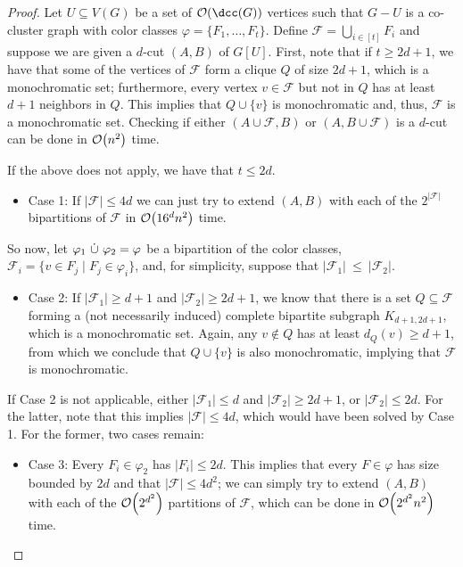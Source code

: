\begin{proof}
    Let $U \subseteq V(G)$ be a set of $\bigO{\dcc(G)}$ vertices such that $G - U$ is a co-cluster graph with color classes $\varphi = \{F_1, \dots, F_t\}$.
    Define $\mathcal{F} = \bigcup_{i \in [t]} F_i$ and suppose we are given a $d$-cut $(A,B)$ of $G[U]$.
    First, note that if $t \geq 2d+1$, we have that some of the vertices of $\mathcal{F}$ form a clique $Q$ of size $2d+1$, which is a monochromatic set; furthermore, every vertex $v \in \mathcal{F}$ but not in $Q$ has at least $d+1$ neighbors in $Q$.
    This implies that $Q \cup \{v\}$ is monochromatic and, thus, $\mathcal{F}$ is a monochromatic set.
    Checking if either $(A \cup \mathcal{F}, B)$ or $(A, B \cup \mathcal{F})$ is a $d$-cut can be done in $\mathcal{O}\!\left(n^2\right)$ time.

    If the above does not apply, we have that $t \leq 2d$.
    \begin{itemize}
        \item Case 1: If $|\mathcal{F}| \leq 4d$ we can just try to extend $(A,B)$ with each of the $2^{|\mathcal{F}|}$ bipartitions of $\mathcal{F}$ in $\mathcal{O}\!\left(16^dn^2\right)$ time.
    \end{itemize}

    So now, let $\varphi_1 \ \dot\cup\  \varphi_2 = \varphi$ be a bipartition of the color classes, $\mathcal{F}_i = \{v \in F_j \mid F_j \in \varphi_i\}$, and, for simplicity, suppose that $|\mathcal{F}_1|~\leq~|\mathcal{F}_2|$.

    \begin{itemize}
        \item Case 2: If $|\mathcal{F}_1| \geq d+1$ and $|\mathcal{F}_2| \geq 2d+1$, we know that there is a set $Q \subseteq \mathcal{F}$ forming a (not necessarily induced) complete bipartite subgraph $K_{d+1, 2d+1}$, which is a monochromatic set.
        Again, any $v \notin Q$ has at least $d_Q(v) \geq d+1$, from which we conclude that $Q \cup \{v\}$ is also monochromatic, implying that $\mathcal{F}$ is monochromatic.
    \end{itemize}


    If Case 2 is not applicable, either $|\mathcal{F}_1| \leq d$ and $|\mathcal{F}_2| \geq 2d+1$, or $|\mathcal{F}_2| \leq 2d$.
    For the latter, note that this implies $|\mathcal{F}| \leq 4d$, which would have been solved by Case 1.
    For the former, two cases remain:

    \begin{itemize}
        \item Case 3: Every $F_i \in \varphi_2$ has $|F_i| \leq 2d$. This implies that every $F \in \varphi$ has size bounded by $2d$ and that $|\mathcal{F}| \leq 4d^2$; we can simply try to extend $(A, B)$ with each of the $\mathcal{O}\!\left(2^{d^2}\right)$ partitions of $\mathcal{F}$, which can be done in $\mathcal{O}\!\left(2^{d^2}n^2\right)$ time.


\end{itemize}
\end{proof}

